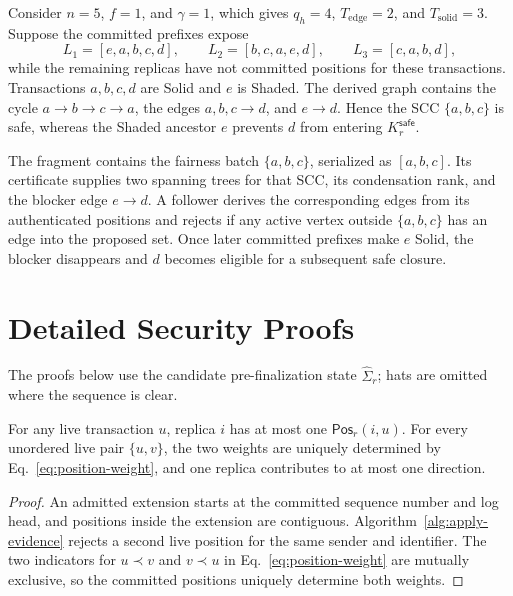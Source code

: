 Consider $n=5$, $f=1$, and $\gamma=1$, which gives $q_h=4$,
$T_{\mathrm{edge}}=2$, and $T_{\mathrm{solid}}=3$.  Suppose the committed
prefixes expose
\[
 L_1=[e,a,b,c,d],\qquad
 L_2=[b,c,a,e,d],\qquad
 L_3=[c,a,b,d],
\]
while the remaining replicas have not committed positions for these
transactions.  Transactions $a,b,c,d$ are Solid and $e$ is Shaded.  The
derived graph contains the cycle $a\to b\to c\to a$, the edges
$a,b,c\to d$, and $e\to d$.  Hence the SCC $\{a,b,c\}$ is safe, whereas the
Shaded ancestor $e$ prevents $d$ from entering $K_r^{\mathsf{safe}}$.

The fragment contains the fairness batch $\{a,b,c\}$, serialized as
$[a,b,c]$.  Its certificate supplies two spanning trees for that SCC, its
condensation rank, and the blocker edge $e\to d$.  A follower derives the
corresponding edges from its authenticated positions and rejects if any active
vertex outside $\{a,b,c\}$ has an edge into the proposed set.  Once later
committed prefixes make $e$ Solid, the blocker disappears and $d$ becomes
eligible for a subsequent safe closure.

\section{Detailed Security Proofs}
\label{app:autig-security-details}

The proofs below use the candidate pre-finalization state
$\widehat\Sigma_r$; hats are omitted where the sequence is clear.

\begin{lemma}
\label{lem:position-uniqueness}
For any live transaction $u$, replica $i$ has at most one
$\mathsf{Pos}_r(i,u)$.  For every unordered live pair $\{u,v\}$, the two
weights are uniquely determined by Eq.~\eqref{eq:position-weight}, and one
replica contributes to at most one direction.
\end{lemma}

\begin{proof}
An admitted extension starts at the committed sequence number and log head,
and positions inside the extension are contiguous.  Algorithm~\ref{alg:apply-evidence}
rejects a second live position for the same sender and identifier.  The two
indicators for $u\prec v$ and $v\prec u$ in Eq.~\eqref{eq:position-weight}
are mutually exclusive, so the committed positions uniquely determine both
weights.
\end{proof}

